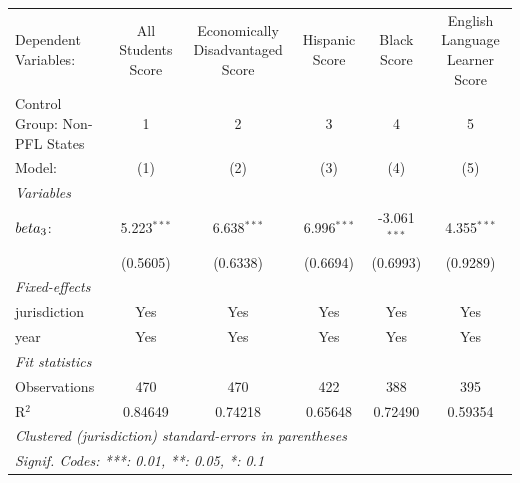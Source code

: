
\begingroup
\centering
\begin{tabular}{lccccc}
   \tabularnewline \midrule \midrule
   Dependent Variables:          & All Students Score & Economically Disadvantaged Score & Hispanic Score & Black Score    & English Language Learner Score\\  
   Control Group: Non-PFL States & 1                  & 2                                & 3              & 4              & 5 \\   
   Model:                        & (1)                & (2)                              & (3)            & (4)            & (5)\\  
   \midrule
   \emph{Variables}\\
   $\\beta_3$:                   & 5.223$^{***}$      & 6.638$^{***}$                    & 6.996$^{***}$  & -3.061$^{***}$ & 4.355$^{***}$\\   
                                 & (0.5605)           & (0.6338)                         & (0.6694)       & (0.6993)       & (0.9289)\\   
   \midrule
   \emph{Fixed-effects}\\
   jurisdiction                  & Yes                & Yes                              & Yes            & Yes            & Yes\\  
   year                          & Yes                & Yes                              & Yes            & Yes            & Yes\\  
   \midrule
   \emph{Fit statistics}\\
   Observations                  & 470                & 470                              & 422            & 388            & 395\\  
   R$^2$                         & 0.84649            & 0.74218                          & 0.65648        & 0.72490        & 0.59354\\  
   \midrule \midrule
   \multicolumn{6}{l}{\emph{Clustered (jurisdiction) standard-errors in parentheses}}\\
   \multicolumn{6}{l}{\emph{Signif. Codes: ***: 0.01, **: 0.05, *: 0.1}}\\
\end{tabular}
\par\endgroup


